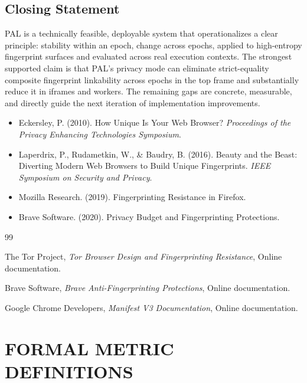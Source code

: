 \documentclass[11pt]{report}
\begin{document}
\section{Closing Statement}

PAL is a technically feasible, deployable system that operationalizes a clear principle: stability within an epoch, change across epochs, applied to high-entropy fingerprint surfaces and evaluated across real execution contexts. The strongest supported claim is that PAL’s privacy mode can eliminate strict-equality composite fingerprint linkability across epochs in the top frame and substantially reduce it in iframes and workers. The remaining gaps are concrete, measurable, and directly guide the next iteration of implementation improvements.

\clearpage


\begin{itemize}
    \item Eckersley, P. (2010). How Unique Is Your Web Browser? \textit{Proceedings of the Privacy Enhancing Technologies Symposium}.
    \item Laperdrix, P., Rudametkin, W., \& Baudry, B. (2016). Beauty and the Beast: Diverting Modern Web Browsers to Build Unique Fingerprints. \textit{IEEE Symposium on Security and Privacy}.
    \item Mozilla Research. (2019). Fingerprinting Resistance in Firefox.
    \item Brave Software. (2020). Privacy Budget and Fingerprinting Protections.
\end{itemize}



\begin{thebibliography}{99}

The Tor Project,
\textit{Tor Browser Design and Fingerprinting Resistance},
Online documentation.

Brave Software,
\textit{Brave Anti-Fingerprinting Protections},
Online documentation.

Google Chrome Developers,
\textit{Manifest V3 Documentation},
Online documentation.

\end{thebibliography}




\appendix

\chapter{FORMAL METRIC DEFINITIONS}
\end{document}
